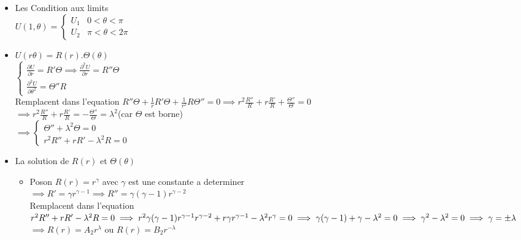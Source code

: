 \documentclass[12pt]{book}
\begin{document}
            \begin{itemize}
                \item Les Condition aux limits \\
                    $U(1,\theta)=\begin{cases} U_1 & 0<\theta<\pi \\ U_2 & \pi<\theta<2\pi \end{cases}$
                \item  $U(r\theta) =R(r).\Theta(\theta)$\\
                        $\begin{cases} \frac{\partial U}{\partial r}=R'\Theta \implies \frac{\partial^2U}{\partial r} = R''\Theta \\ \frac{\partial^2 U }{\partial \theta^2} = \Theta''R \end{cases}$\\
                        Remplacent dans l'equation $ R''\Theta + \frac{1}{r}R'\Theta +\frac{1}{r^2}R\Theta'' = 0 \implies r^2\frac{R''}{R}+r\frac{R'}{R}+\frac{\Theta''}{\Theta}=0 $\\
                        $ \implies r^2\frac{R''}{R}+r\frac{R'}{R}=-\frac{\Theta''}{\Theta}=\lambda^2 $(car $ \Theta $ est borne)\\
                        $ \implies \begin{cases} \Theta'' + \lambda^2\Theta =0 \\ r^2R''+rR'-\lambda^2R =0 \end{cases} $
                \item La solution de $R(r)$ et $ \Theta(\theta) $\\
                   \begin{itemize}
                    \item  Poson $R(r)=r^\gamma$ avec $ \gamma  $ est une constante a determiner \\
                        $ \implies R'=\gamma r^{\gamma-1} \implies R'' = \gamma(\gamma-1)r^{\gamma-2} $\\
                        Remplacent dans l'equation $r^2R''+rR'-\lambda^2R =0  \\ 
                        \implies r^2\gamma(\gamma-1)r^{\gamma-1}r^{\gamma-2}+r\gamma r^{\gamma-1}-\lambda^2r^\gamma =0 \\
                        \implies \gamma(\gamma-1)+\gamma -\lambda^2=0\implies \gamma^2-\lambda^2=0\implies \gamma =\pm\lambda$ \\
                        $\implies R(r) = A_2r^\lambda $ ou $ R(r)=B_2r^{-\lambda} $\\

\end{itemize}
\end{itemize}
\end{document}
